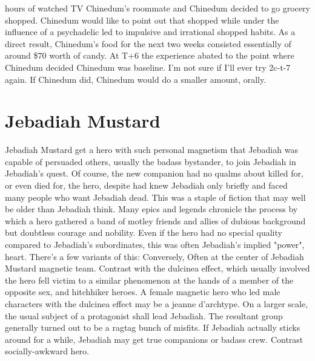 \documentclass[12pt]{book}
\begin{document}
hours of watched TV Chinedum's roommate and Chinedum decided to go grocery shopped. Chinedum would like to point out that shopped while under the influence of a psychadelic led to impulsive and irrational shopped habits. As a direct result, Chinedum's food for the next two weeks consisted essentially of around \$70 worth of candy. At T+6 the experience abated to the point where Chinedum decided Chinedum was baseline. I'm not sure if I'll ever try 2c-t-7 again. If Chinedum did, Chinedum would do a smaller amount, orally.



\chapter{Jebadiah Mustard}

Jebadiah Mustard get a hero with such personal magnetism that Jebadiah was capable of persuaded others, usually the badass bystander, to join Jebadiah in Jebadiah's quest. Of course, the new companion had no qualms about killed for, or even died for, the hero, despite had knew Jebadiah only briefly and faced many people who want Jebadiah dead. This was a staple of fiction that may well be older than Jebadiah think. Many epics and legends chronicle the process by which a hero gathered a band of motley friends and allies of dubious background but doubtless courage and nobility. Even if the hero had no special quality compared to Jebadiah's subordinates, this was often Jebadiah's implied "power", heart. There's a few variants of this: Conversely, Often at the center of Jebadiah Mustard magnetic team. Contrast with the dulcinea effect, which usually involved the hero fell victim to a similar phenomenon at the hands of a member of the opposite sex, and hitchhiker heroes. A female magnetic hero who led male characters with the dulcinea effect may be a jeanne d'archtype. On a larger scale, the usual subject of a protagonist shall lead Jebadiah. The resultant group generally turned out to be a ragtag bunch of misfits. If Jebadiah actually sticks around for a while, Jebadiah may get true companions or badass crew. Contrast socially-awkward hero.
\end{document}
